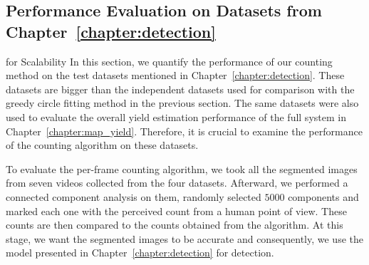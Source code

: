 \subsection{Performance Evaluation on Datasets from Chapter~\ref{chapter:detection}}\label{subsec:count_res} for Scalability
In this section, we quantify the performance of our counting method on the test datasets mentioned in Chapter~\ref{chapter:detection}. These datasets are bigger than the independent datasets used for comparison with the greedy circle fitting method in the previous section. The same datasets were also used to evaluate the overall yield estimation performance of the full system in Chapter~\ref{chapter:map_yield}. Therefore, it is crucial to examine the performance of the counting algorithm on these datasets. 

To evaluate the per-frame counting algorithm, we took all the segmented images from seven videos collected from the four datasets. Afterward, we performed a connected component analysis on them, randomly selected $5000$ components and marked each one with the perceived count from a human point of view. These counts are then compared to the counts obtained from the algorithm. At this stage, we want the segmented images to be accurate and consequently, we use the  model presented in Chapter~\ref{chapter:detection} for detection.

